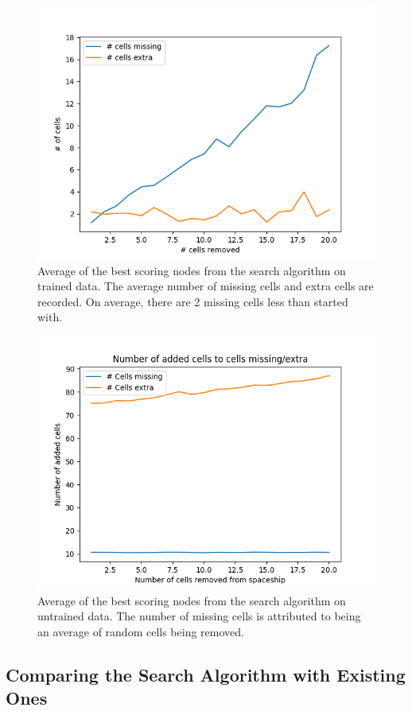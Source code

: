 \documentclass{l4proj}
\begin{document}
\begin{figure}[h!]
\centering
\includegraphics[width=0.8\linewidth]{dissertation/images/graphs/number_of_cells_n_cells_removed_trained.png}
\caption{Average of the best scoring nodes from the search algorithm on trained data. The average number of missing cells and extra cells are recorded. On average, there are 2 missing cells less than started with.}
\label{fig:subim1}
\end{figure}

\begin{figure}[h!]
\centering
\includegraphics[width=0.8\linewidth]{dissertation/images/graphs/cells_added_n_cells_extra_missing_probability_analysis_untrained.png}
\caption{Average of the best scoring nodes from the search algorithm on untrained data. The number of missing cells is attributed to being an average of random cells being removed.}
\label{fig:subim1}
\end{figure}

\subsection{Comparing the Search Algorithm with Existing Ones}
\end{document}
